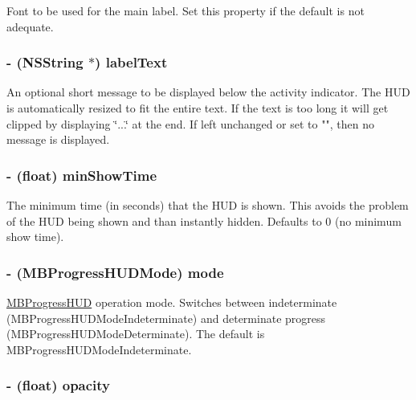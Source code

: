 \label{interface_m_b_progress_h_u_d_a85b03f18b8313f4c3efc2002ad79ff27}
Font to be used for the main label. Set this property if the default is not adequate. \hypertarget{interface_m_b_progress_h_u_d_ae43d72850b8dd657db1b383be0566093}{
\subsubsection[{labelText}]{\setlength{\rightskip}{0pt plus 5cm}-\/ ({\bf NSString} $\ast$) labelText}}
\label{interface_m_b_progress_h_u_d_ae43d72850b8dd657db1b383be0566093}
An optional short message to be displayed below the activity indicator. The HUD is automatically resized to fit the entire text. If the text is too long it will get clipped by displaying \char`\"{}...\char`\"{} at the end. If left unchanged or set to "", then no message is displayed. \hypertarget{interface_m_b_progress_h_u_d_a9946e4b0b16d75f070ff0cbcc50226ef}{
\subsubsection[{minShowTime}]{\setlength{\rightskip}{0pt plus 5cm}-\/ (float) minShowTime}}
\label{interface_m_b_progress_h_u_d_a9946e4b0b16d75f070ff0cbcc50226ef}
The minimum time (in seconds) that the HUD is shown. This avoids the problem of the HUD being shown and than instantly hidden. Defaults to 0 (no minimum show time). \hypertarget{interface_m_b_progress_h_u_d_ace77eaaf507e86fe56436f7ee7b6fdc9}{
\subsubsection[{mode}]{\setlength{\rightskip}{0pt plus 5cm}-\/ (MBProgressHUDMode) mode}}
\label{interface_m_b_progress_h_u_d_ace77eaaf507e86fe56436f7ee7b6fdc9}
\hyperlink{interface_m_b_progress_h_u_d}{MBProgressHUD} operation mode. Switches between indeterminate (MBProgressHUDModeIndeterminate) and determinate progress (MBProgressHUDModeDeterminate). The default is MBProgressHUDModeIndeterminate. \hypertarget{interface_m_b_progress_h_u_d_a24ab5e37917e3489d6add081324a49ff}{
\subsubsection[{opacity}]{\setlength{\rightskip}{0pt plus 5cm}-\/ (float) opacity}}
